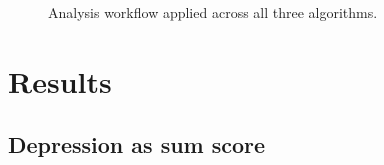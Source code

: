 \documentclass[
]{article}
\begin{document}
\begin{figure}


\caption{\label{fig-workflow}Analysis workflow applied across all three
algorithms.}

\end{figure}%

\section{Results}\label{results}

\subsection{Depression as sum score}\label{depression-as-sum-score}
\end{document}
